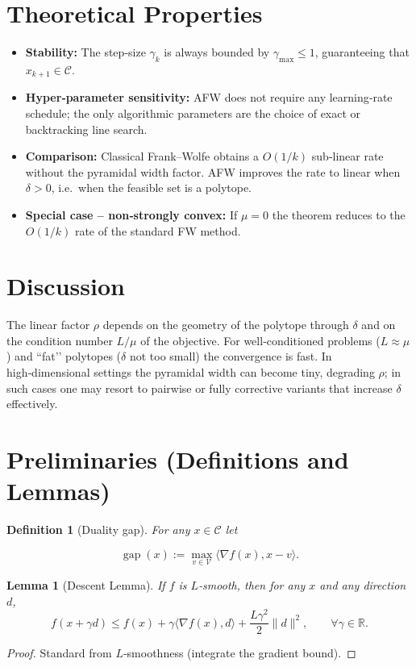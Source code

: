 \documentclass{article}
\newtheorem{lemma}{Lemma}
\newtheorem{definition}{Definition}
\newcommand{\gap}{\operatorname{gap}}
\newcommand{\poly}{\mathcal{C}}
\newcommand{\grad}{\nabla}
\newcommand{\R}{\mathbb{R}}
\begin{document}
\section*{Theoretical Properties}
\begin{itemize}
\item \textbf{Stability:} The step‑size $\gamma_k$ is always bounded by
$\gamma_{\max}\le 1$, guaranteeing that $x_{k+1}\in\poly$.
\item \textbf{Hyper‑parameter sensitivity:} AFW does not require any
learning‑rate schedule; the only algorithmic parameters are the
choice of exact or backtracking line search.
\item \textbf{Comparison:} Classical Frank–Wolfe obtains a
$O(1/k)$ sub‑linear rate without the pyramidal width factor.
AFW improves the rate to linear when $\delta>0$, i.e.\ when the feasible
set is a polytope.
\item \textbf{Special case – non‑strongly convex:} If $\mu=0$ the theorem
reduces to the $O(1/k)$ rate of the standard FW method.
\end{itemize}

\section*{Discussion}
The linear factor $\rho$ depends on the geometry of the polytope through
$\delta$ and on the condition number $L/\mu$ of the objective.
For well‑conditioned problems ($L\approx\mu$) and “fat’’ polytopes
($\delta$ not too small) the convergence is fast.  In high‑dimensional
settings the pyramidal width can become tiny, degrading $\rho$; in such
cases one may resort to pairwise or fully corrective variants that
increase $\delta$ effectively.

\section*{Preliminaries (Definitions and Lemmas)}
\begin{definition}[Duality gap]\label{def:gap}
For any $x\in\poly$ let  

\[
\gap(x) := \max_{v\in\mathcal{V}}\langle \grad f(x),x-v\rangle .
\]
\end{definition}

\begin{lemma}[Descent Lemma]\label{lem:descent}
If $f$ is $L$‑smooth, then for any $x$ and any direction $d$,
\[
f(x+\gamma d) \le f(x) + \gamma \langle\grad f(x),d\rangle
+ \frac{L\gamma^{2}}{2}\|d\|^{2},\qquad \forall\gamma\in\R .
\]
\end{lemma}
\begin{proof}
Standard from $L$‑smoothness (integrate the gradient bound). \qedhere
\end{proof}
\end{document}
